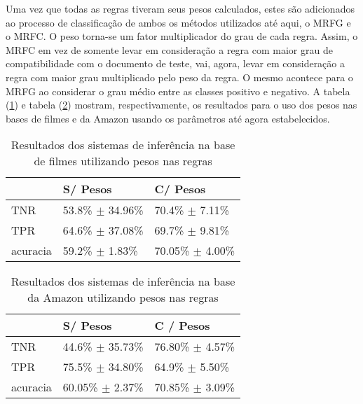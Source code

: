 Uma vez que todas as regras tiveram seus pesos calculados, estes são adicionados ao processo de classificação de ambos os métodos utilizados até aqui, o MRFG e o MRFC. O peso torna-se um fator multiplicador do grau de cada regra. Assim, o MRFC em vez de somente levar em consideração a regra com maior grau de compatibilidade com o documento de teste, vai, agora, levar em consideração a regra com maior grau multiplicado pelo peso da regra. O mesmo acontece para o MRFG ao considerar o grau médio entre as classes positivo e negativo. A tabela (\ref{table:movies2_pesos}) e tabela (\ref{table:amazon2_pesos}) mostram, respectivamente, os resultados para o uso dos pesos nas bases de filmes e da Amazon usando os parâmetros até agora estabelecidos. 

\begin{table}[!h]
    \begin{tabular}{lll}
 	~         			& S/ Pesos 								& C/ Pesos \\ \hline
    TNR 				& 53.8\% $\pm$ 34.96\%   	& 70.4\% $\pm$ 7.11\%    \\
    TPR    			& 64.6\% $\pm$ 37.08\%   	& 69.7\% $\pm$ 9.81\%   \\   
    acuracia  		& 59.2\% $\pm$ 1.83\%    	& 70.05\% $\pm$ 4.00\%    \\
    \end{tabular}
    \caption{Resultados dos sistemas de inferência na base de filmes utilizando pesos nas regras}
	\label{table:movies2_pesos}
\end{table}

%
%
%

\begin{table}[!h]
    \begin{tabular}{lll}
    ~         			& S/ Pesos									& C / Pesos \\ \hline
    TNR 				& 44.6\% $\pm$ 35.73\%    	& 76.80\% $\pm$ 4.57\%    \\
    TPR    			& 75.5\% $\pm$ 34.80\%    	& 64.9\% $\pm$ 5.50\%    \\
    acuracia  		& 60.05\% $\pm$ 2.37\%    	& 70.85\% $\pm$ 3.09\%   \\
    \end{tabular}
    \caption{Resultados dos sistemas de inferência na base da Amazon utilizando pesos nas regras}
	\label{table:amazon2_pesos}
\end{table}

